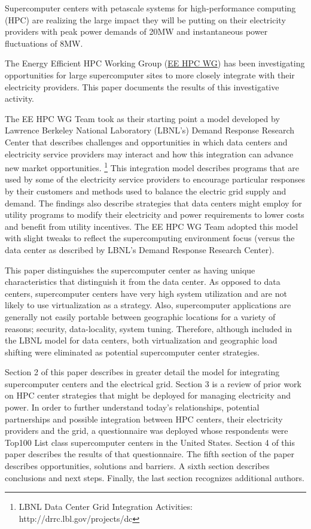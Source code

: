 Supercomputer centers with petascale systems for high-performance 
computing (HPC) are realizing the large impact they will be 
putting on their electricity providers with peak power demands of 20MW and instantaneous power fluctuations of 8MW. 
 
The Energy Efficient HPC Working Group 
(\href {http://eehpcwg.lbl.gov/}{EE HPC WG}) 
has been investigating opportunities for large supercomputer sites to more closely 
integrate with their electricity providers. This paper documents the 
results of this investigative activity. 

The EE HPC WG Team took as their starting point a model developed by
Lawrence Berkeley National Laboratory (LBNL's) Demand Response Research Center
that describes challenges and opportunities in which data centers and electricity
service providers may interact and how this integration can advance new market opportunities. \footnote{LBNL
Data Center Grid Integration Activities: http://drrc.lbl.gov/projects/dc} This integration model
describes programs that are used by some of the electricity service providers to encourage particular
responses by their customers and methods used to balance the electric grid supply and demand.
The findings also describe strategies that data centers might employ for utility programs to modify
their electricity and power requirements to lower costs and benefit from utility incentives. The EE HPC WG Team
adopted this model with slight tweaks to reflect the supercomputing environment focus 
(versus the data center as described by LBNL's Demand Response Research Center).


This paper distinguishes the supercomputer center
as having unique characteristics that distinguish it from the data center. As opposed to data centers, 
supercomputer centers 
have very high system utilization and are not likely to use virtualization as a strategy.  
Also, supercomputer applications are generally not easily portable between 
geographic locations for a variety of reasons; security, data-locality, system tuning. 
Therefore, although included in the LBNL model for data centers, both virtualization and geographic load 
shifting were eliminated as
potential supercomputer center strategies.


Section 2 of this paper describes in greater detail the model for
integrating supercomputer centers and the electrical grid. Section 3 
is a review of prior work on HPC center strategies that might be
deployed for managing electricity and power. In order to further understand
today's relationships, potential partnerships and possible integration
between HPC centers, their electricity providers and the grid, a
questionnaire was deployed whose respondents were Top100 List class
supercomputer centers in the United States. Section 4 of this paper
describes the results of that questionnaire. The fifth section of the paper
describes opportunities, solutions and barriers. A sixth section describes
conclusions and next steps. Finally, the last section recognizes additional
authors.

